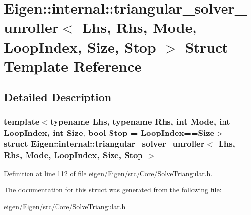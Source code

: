 \hypertarget{struct_eigen_1_1internal_1_1triangular__solver__unroller}{}\section{Eigen\+:\+:internal\+:\+:triangular\+\_\+solver\+\_\+unroller$<$ Lhs, Rhs, Mode, Loop\+Index, Size, Stop $>$ Struct Template Reference}
\label{struct_eigen_1_1internal_1_1triangular__solver__unroller}


\subsection{Detailed Description}
\subsubsection*{template$<$typename Lhs, typename Rhs, int Mode, int Loop\+Index, int Size, bool Stop = Loop\+Index==\+Size$>$\newline
struct Eigen\+::internal\+::triangular\+\_\+solver\+\_\+unroller$<$ Lhs, Rhs, Mode, Loop\+Index, Size, Stop $>$}



Definition at line \hyperlink{eigen_2_eigen_2src_2_core_2_solve_triangular_8h_source_l00112}{112} of file \hyperlink{eigen_2_eigen_2src_2_core_2_solve_triangular_8h_source}{eigen/\+Eigen/src/\+Core/\+Solve\+Triangular.\+h}.



The documentation for this struct was generated from the following file\+:\begin{DoxyCompactItemize}
\item 
eigen/\+Eigen/src/\+Core/\+Solve\+Triangular.\+h\end{DoxyCompactItemize}
